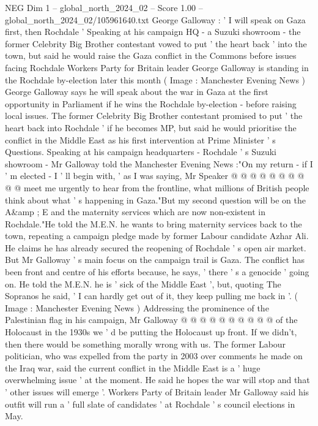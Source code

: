 \begin{textsample}{NEG Dim 1 – global\_north\_2024\_02 – Score 1.00 – global\_north\_2024\_02/105961640.txt}  \label{ex:f1_neg_358}
George Galloway : ' I will speak on Gaza first, then Rochdale ' Speaking at his campaign HQ - a Suzuki showroom - the former Celebrity Big Brother contestant vowed to put ' the heart back ' into the town, but said he would raise the Gaza conflict in the Commons before issues facing Rochdale Workers Party for Britain leader George Galloway is standing in the Rochdale by-election later this month ( Image : Manchester Evening News ) George Galloway says he will speak about the war in Gaza at the first opportunity in Parliament if he wins the Rochdale by-election - before raising local issues.
The former Celebrity Big Brother contestant promised to put ' the heart back into Rochdale ' if he becomes MP, but said he would prioritise the conflict in the Middle East as his first intervention at Prime Minister ' s Questions.
Speaking at his campaign headquarters - Rochdale ' s Suzuki showroom - Mr Galloway told the Manchester Evening News :"On my return - if I ' m elected - I ' ll begin with, ' as I was saying, Mr Speaker @ @ @ @ @ @ @ @ @ @ meet me urgently to hear from the frontline, what millions of British people think about what ' s happening in Gaza."But my second question will be on the A\&amp ; E and the maternity services which are now non-existent in Rochdale."He told the M.E.N. he wants to bring maternity services back to the town, repeating a campaign pledge made by former Labour candidate Azhar Ali.
He claims he has already secured the reopening of Rochdale ' s open air market.
But Mr Galloway ' s main focus on the campaign trail is Gaza.
The conflict has been front and centre of his efforts because, he says, ' there ' s a genocide ' going on.
He told the M.E.N. he is ' sick of the Middle East ', but, quoting The Sopranos he said, ' I can hardly get out of it, they keep pulling me back in '. ( Image : Manchester Evening News ) Addressing the prominence of the Palestinian flag in his campaign, Mr Galloway @ @ @ @ @ @ @ @ @ @ of the Holocaust in the 1930s we ' d be putting the Holocaust up front.
If we didn't, then there would be something morally wrong with us.
The former Labour politician, who was expelled from the party in 2003 over comments he made on the Iraq war, said the current conflict in the Middle East is a ' huge overwhelming issue ' at the moment.
He said he hopes the war will stop and that ' other issues will emerge '.
Workers Party of Britain leader Mr Galloway said his outfit will run a ' full slate of candidates ' at Rochdale ' s council elections in May.

\end{textsample}
